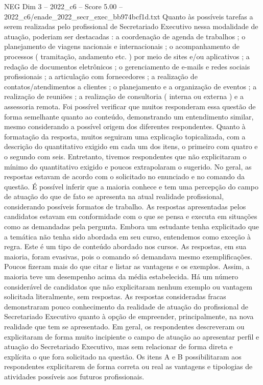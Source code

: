 \begin{textsample}{NEG Dim 3 – 2022\_c6 – Score 5.00 – 2022\_c6/enade\_2022\_secr\_exec\_bb974bcf1d.txt}
Quanto às possíveis tarefas a serem realizadas pelo profissional de Secretariado Executivo nessa modalidade de atuação, poderiam ser destacadas : a coordenação de agenda de trabalhos ; o planejamento de viagens nacionais e internacionais ; o acompanhamento de processos ( tramitação, andamento etc. ) por meio de sites e/ou aplicativos ; a redação de documentos eletrônicos ; o gerenciamento de e-mails e redes sociais profissionais ; a articulação com fornecedores ; a realização de contatos/atendimentos a clientes ; o planejamento e a organização de eventos ; a realização de reuniões ; a realização de consultoria ( interna ou externa ) e a assessoria remota.
Foi possível verificar que muitos responderam essa questão de forma semelhante quanto ao conteúdo, demonstrando um entendimento similar, mesmo considerando a possível origem dos diferentes respondentes.
Quanto à formatação da resposta, muitos seguiram uma explicação topicalizada, com a descrição do quantitativo exigido em cada um dos itens, o primeiro com quatro e o segundo com seis.
Entretanto, tivemos respondentes que não explicitaram o mínimo do quantitativo exigido e poucos extrapolaram o sugerido.
No geral, as respostas estavam de acordo com o solicitado no enunciado e no comando da questão.
É possível inferir que a maioria conhece e tem uma percepção do campo de atuação do que de fato se apresenta na atual realidade profissional, considerando possíveis formatos de trabalho.
As respostas apresentadas pelos candidatos estavam em conformidade com o que se pensa e executa em situações como as demandadas pela pergunta.
Embora um estudante tenha explicitado que a temática não tenha sido abordada em seu curso, entendemos como exceção à regra.
Este é um tipo de conteúdo abordado nos cursos.
As respostas, em sua maioria, foram evasivas, pois o comando só demandava mesmo exemplificações.
Poucos fizeram mais do que citar e listar as vantagens e os exemplos.
Assim, a maioria teve um desempenho acima da média estabelecida.
Há um número considerável de candidatos que não explicitaram nenhum exemplo ou vantagem solicitada literalmente, sem respostas.
As respostas consideradas fracas demonstraram pouco conhecimento da realidade de atuação do profissional de Secretariado Executivo quanto à opção de empreender, principalmente, na nova realidade que tem se apresentado.
Em geral, os respondentes descreveram ou explicitaram de forma muito incipiente o campo de atuação ao apresentar perfil e atuação do Secretariado Executivo, mas sem relacionar de forma direta e explícita o que fora solicitado na questão.
Os itens A e B possibilitaram aos respondentes explicitarem de forma correta ou real as vantagens e tipologias de atividades possíveis aos futuros profissionais.

\end{textsample}
